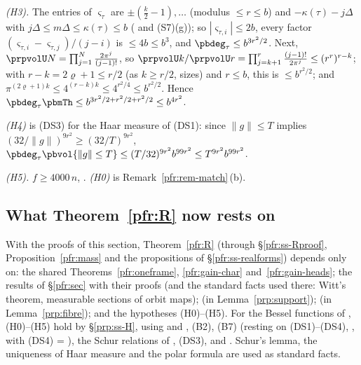 \documentclass[10pt]{amsart}
\theoremstyle{definition}
\theoremstyle{remark}
\begin{document}
\emph{(H3).} The entries of $\varsigma_\tau$ are $\pm(\frac k2-1),\dots$ (modulus $\le r\le b$) and
$-\kappa(\tau)-j\Delta$ with $j\Delta\le m\Delta\le\kappa(\tau)\le b$ ({\cite[Lemma~13.4\,(S5)]{P46}} and (S7)(g)); so $|\varsigma_{\tau,i}|\le2b$, every factor $(\varsigma_{\tau,i}-\varsigma_{\tau,j})/(j-i)$ is
$\le4b\le b^3$, and $\pbdeg_\tau\le b^{3r^2/2}$. Next, $\prpvolU N=\prod_{j=1}^N\frac{2\pi^j}{(j-1)!}$, so
$\prpvolU k/\prpvolU r=\prod_{j=k+1}^r\frac{(j-1)!}{2\pi^j}\le(r^r)^{r-k}$; with $r-k=2\varrho+1\le r/2$ (as $k\ge r/2$,
{\cite[\S3.2.1]{P51}} sizes) and $r\le b$, this is $\le b^{r^2/2}$; and $\pi^{(2\varrho+1)k}\le4^{(r-k)k}\le4^{r^2/4}\le
b^{r^2/2}$. Hence $\pbdeg_\tau\pbmTh\le b^{3r^2/2+r^2/2+r^2/2}\le b^{4r^2}$.

\emph{(H4)} is \textup{(DS3)} for the Haar measure of \textup{(DS1)}: since $\|g\|\le T$ implies $(32/\|g\|)^{9r^2}\ge
(32/T)^{9r^2}$, $\pbdeg_\tau\pbvol\{\|g\|\le T\}\le(T/32)^{9r^2}b^{99r^2}\le T^{9r^2}b^{99r^2}$.

\emph{(H5).} $f\ge4000\,n$, {\cite[Lemma~13.4\,(S7)(b)]{P46}}. \emph{(H0)} is
Remark~\ref{pfr:rem-match}\,(b).

\subsection{What Theorem~\ref{pfr:R} now rests on}\label{prp:ss-R}

With the proofs of this section, Theorem~\ref{pfr:R} (through \S\ref{pfr:ss-Rproof}, Proposition~\ref{pfr:mass} and
the propositions of \S\ref{pfr:ss-realforms}) depends only on: the shared Theorems~\ref{pfr:oneframe},
\ref{pfr:gain-char} and~\ref{pfr:gain-heads}; the results of \S\ref{pfr:sec} with their proofs (and the standard
facts used there: Witt's theorem, measurable sections of orbit maps); {\cite[Proposition~3.41]{P51}} (in
Lemma~\ref{prp:support}); {\cite[Lemmas~8.80 and~8.81]{P51}} (in Lemma~\ref{prp:fibre}); and the hypotheses
(H0)--(H5). For the Bessel functions of {\cite[Theorem~3.22]{P51}}, (H0)--(H5) hold by \S\ref{prp:ss-H}, using
{\cite[Proposition~3.18]{P51}} and {\cite[Theorem~3.22\,(B1)]{P51}}, (B2), (B7) (resting on \textup{(DS1)}--\textup{(DS4)},
{\cite[Theorem~3.16]{P51}}, with \textup{(DS4)} = {\cite[Theorem~7.2]{P51}}), the Schur relations of {\cite[\S5.4]{P51}},
\textup{(DS3)}, and {\cite[Lemma~13.4]{P46}}. Schur's lemma, the uniqueness of Haar measure and the polar formula are
used as standard facts.
\end{document}
